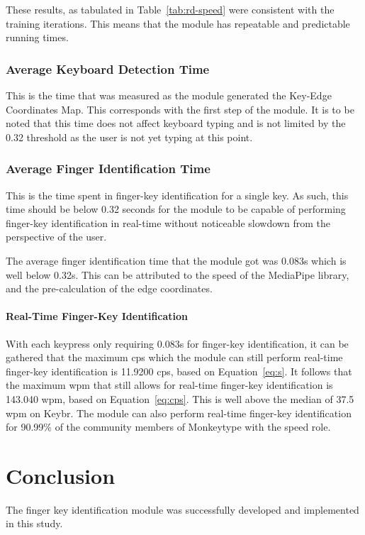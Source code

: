 \documentclass{report}
\begin{document}
These results, as tabulated in Table~\ref{tab:rd-speed} were consistent with the
training iterations. This means that the module has repeatable and predictable
running times.

\subsection{Average Keyboard Detection Time}
This is the time that was measured as the module generated the Key-Edge
Coordinates Map. This corresponds with the first step of the module. It is to be
noted that this time does not affect keyboard typing and is not limited by the
0.32 threshold as the user is not yet typing at this point.

\subsection{Average Finger Identification Time}
This is the time spent in finger-key identification for a single key. As such,
this time should be below 0.32 seconds for the module to be capable of
performing finger-key identification in real-time without noticeable slowdown
from the perspective of the user.

The average finger identification time that the module got was 0.083s which is
well below 0.32s. This can be attributed to the speed of the MediaPipe library,
and the pre-calculation of the edge coordinates.

\subsubsection{Real-Time Finger-Key Identification}
With each keypress only requiring 0.083s for finger-key identification, it can
be gathered that the maximum \ac{cps} which the module can still perform
real-time finger-key identification is 11.9200 \ac{cps}, based on
Equation~\ref{eq:s}. It follows that the maximum \ac{wpm} that still allows for
real-time finger-key identification is 143.040 \ac{wpm}, based on
Equation~\ref{eq:cps}. This is well above the median of 37.5 \ac{wpm} on Keybr.
The module can also perform real-time finger-key identification for 90.99\% of
the community members of Monkeytype with the speed role.

\chapter{Conclusion}

The finger key identification module was successfully developed and implemented
in this study.
\end{document}
